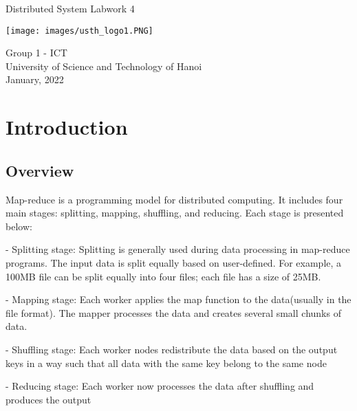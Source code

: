 \documentclass[13pt]{article}
\begin{document}
\begin{titlepage}
    \begin{center}
        \vspace*{1.8cm}
        \Large
        Distributed System Labwork 4\\
        \Large
        \vspace{0.5cm}
        \begin{center}
            \texttt{[image: images/usth\_logo1.PNG]}
        \end{center}  
        \vspace{0.5cm}
            Group 1 - ICT\\
        \vspace{0.5cm}
            University of Science and Technology of Hanoi\\
        \vspace{0.5cm}
            January, 2022
        \vfill
          
   \end{center}
\end{titlepage}

\newpage
\tableofcontents
\newpage


\section{Introduction}
\subsection{Overview}
\noindent%
Map-reduce is a programming model for distributed computing. It includes four main stages: splitting, mapping, shuffling, and reducing. Each stage is presented below:

\noindent%
- Splitting stage: Splitting is generally used during data processing in map-reduce programs. The input data is split equally based on user-defined. For example, a 100MB file can be split equally into four files; each file has a size of 25MB.

\noindent%
- Mapping stage: Each worker applies the map function to the data(usually in the file format). The mapper processes the data and creates several small chunks of data.

\noindent%
- Shuffling stage: Each worker nodes redistribute the data based on the output keys in a way such that all data with the same key belong to the same node

\noindent%
- Reducing stage: Each worker now processes the data after shuffling and produces the output
\end{document}

